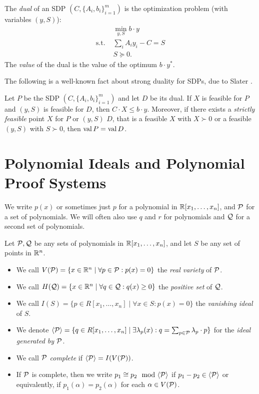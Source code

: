 \begin{definition}
The \emph{dual} of an SDP $(C, \{A_i, b_i\}_{i=1}^m)$ is the optimization problem (with variables $(y,S)$):
\begin{align*}
&\min_{y,S} b \cdot y \\
\text{s.t. }&\sum_i A_i y_i - C = S \\
&S \succeq 0.
\end{align*}
The \emph{value} of the dual is the value of the optimum $b \cdot y^*$.
\end{definition}
The following is a well-known fact about strong duality for SDPs, due to Slater \cite{Slater2014}.
\begin{lemma}\label{lem:duality}
Let $P$ be the SDP $(C, \{A_i, b_i\}_{i=1}^m)$ and let $D$ be its dual. If $X$ is feasible for $P$ and $(y,S)$ is feasible for $D$, then $C \cdot X \leq b \cdot y$. Moreover, if there exists a \emph{strictly feasible} point $X$ for $P$ or $(y,S)$ $D$, that is a feasible $X$ with $X \succ 0$ or a feasible $(y,S)$ with $S \succ 0$, then $\operatorname{val}{P} = \operatorname{val}{D}$.
\end{lemma}

\section{Polynomial Ideals and Polynomial Proof Systems}\label{sec:polyproofs}
We write $p(x)$ or sometimes just $p$ for a polynomial in $\mathbb R[x_1,\dots,x_n]$, and $\mathcal P$ for a set of polynomials.
We will often also use $q$ and $r$ for polynomials and $\mathcal Q$ for a second set of polynomials.
\begin{definition}
Let $\mathcal P,\mathcal Q$ be any sets of polynomials in $\mathbb R[x_1,\dots,x_n]$, and let $S$ be any set of points in $\mathbb R^n$.
\begin{itemize}
\item We call $V(\mathcal P) = \{x \in \mathbb R^n \mid \forall p \in \mathcal P: p(x) = 0\}$ the \emph{real variety} of $\mathcal P$.
\item We call $H(\mathcal Q) = \{x \in \mathbb R^n \mid \forall q \in \mathcal Q: q(x) \geq 0\}$ the \emph{positive set} of $\mathcal Q$.
\item We call $I(S) = \{p \in R[x_1,\dots,x_n] \mid \forall x \in S: p(x) = 0\}$ the \emph{vanishing ideal} of $S$.
\item We denote $\langle \mathcal P \rangle = \{q \in R[x_1,\dots,x_n] \mid \exists \lambda_p(x): q = \sum_{p \in \mathcal P} \lambda_p \cdot p\}$ for the \emph{ideal generated by $\mathcal P$}.
\item We call $\mathcal P$ \emph{complete} if $\langle \mathcal P \rangle = I(V(\mathcal P))$.
\item If $\mathcal P$ is complete, then we write $p_1 \cong p_2 \mod \gen{\cP}$ if $p_1 - p_2 \in \langle \mathcal P \rangle$ or equivalently, if $p_1(\alpha) = p_2(\alpha)$ for each $\alpha \in V(\mathcal P)$.
\end{itemize}
\end{definition}


